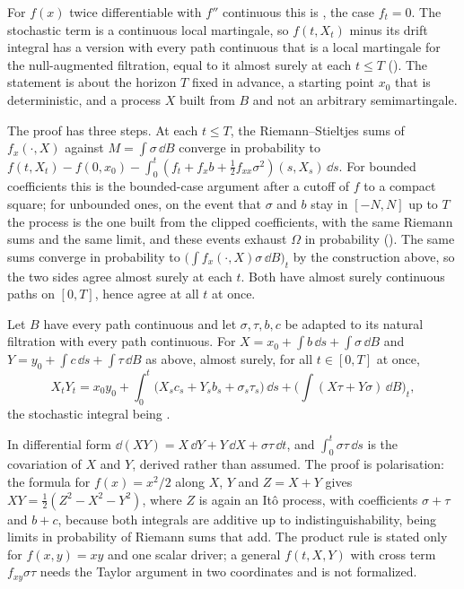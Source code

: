 \documentclass[11pt]{article}
\begin{document}
For $f(x)$ twice differentiable with $f''$ continuous this is , the case
$f_t=0$. The stochastic term is a continuous local martingale, so $f(t,X_t)$ minus its drift integral has a version
with every path continuous that is a local martingale for the null-augmented filtration, equal to it almost surely
at each $t\le T$ (). The statement is about the horizon $T$ fixed in
advance, a starting point $x_0$ that is deterministic, and a process $X$ built from $B$ and not an arbitrary
semimartingale.

The proof has three steps. At each $t\le T$, the Riemann--Stieltjes sums of $f_x(\cdot,X)$ against
$M=\int\sigma\,\dd B$ converge in probability to $f(t,X_t)-f(0,x_0)-\int_0^t(f_t+f_xb+\frac12f_{xx}\sigma^2)(s,X_s)\,\dd s$.
For bounded coefficients this is the bounded-case argument after a cutoff of $f$ to a compact square; for unbounded
ones, on the event that $\sigma$ and $b$ stay in $[-N,N]$ up to $T$ the process is the one built from the clipped
coefficients, with the same Riemann sums and the same limit, and these events exhaust $\Omega$ in probability
(). The same sums converge in probability to $\bigl(\int
f_x(\cdot,X)\sigma\,\dd B\bigr)_t$ by the construction above, so the two sides agree almost surely at each $t$.
Both have almost surely continuous paths on $[0,T]$, hence agree at all $t$ at once.

\begin{theorem}\label{thm:product}
Let $B$ have every path continuous and let $\sigma,\tau,b,c$ be adapted to its natural filtration with every path
continuous. For $X=x_0+\int b\,\dd s+\int\sigma\,\dd B$ and $Y=y_0+\int c\,\dd s+\int\tau\,\dd B$ as above, almost
surely, for all $t\in[0,T]$ at once,
\[
  X_tY_t=x_0y_0+\int_0^t\bigl(X_sc_s+Y_sb_s+\sigma_s\tau_s\bigr)\,\dd s+\bigl(\textstyle\int(X\tau+Y\sigma)\,\dd B\bigr)_t ,
\]
the stochastic integral being .
\end{theorem}

In differential form $\dd(XY)=X\,\dd Y+Y\,\dd X+\sigma\tau\,\dd t$, and $\int_0^t\sigma\tau\,\dd s$ is the
covariation of $X$ and $Y$, derived rather than assumed. The proof is polarisation: the formula for $f(x)=x^2/2$
along $X$, $Y$ and $Z=X+Y$ gives $XY=\frac12(Z^2-X^2-Y^2)$, where $Z$ is again an It\^o process, with coefficients
$\sigma+\tau$ and $b+c$, because both integrals are additive up to indistinguishability, being limits in
probability of Riemann sums that add. The product rule is stated only for $f(x,y)=xy$ and one scalar driver; a general
$f(t,X,Y)$ with cross term $f_{xy}\sigma\tau$ needs the Taylor argument in two coordinates and is not formalized.
\end{document}

